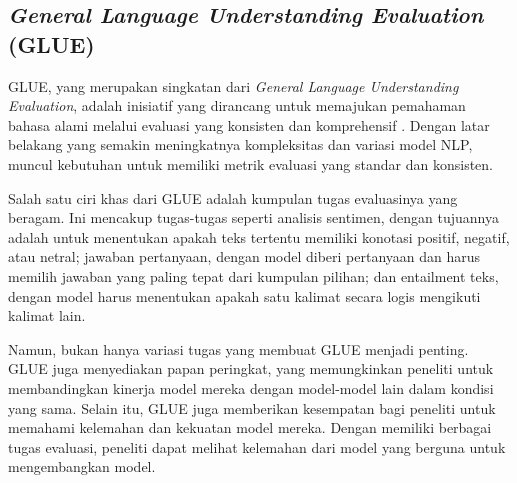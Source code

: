 \subsection{\textit{General Language Understanding Evaluation} (GLUE)}

GLUE, yang merupakan singkatan dari \textit{General Language Understanding Evaluation}, adalah inisiatif yang dirancang untuk memajukan pemahaman bahasa alami melalui evaluasi yang konsisten dan komprehensif \parencite{glue}. Dengan latar belakang yang semakin meningkatnya kompleksitas dan variasi model NLP, muncul kebutuhan untuk memiliki metrik evaluasi yang standar dan konsisten. 

Salah satu ciri khas dari GLUE adalah kumpulan tugas evaluasinya yang beragam. Ini mencakup tugas-tugas seperti analisis sentimen, dengan tujuannya adalah untuk menentukan apakah teks tertentu memiliki konotasi positif, negatif, atau netral; jawaban pertanyaan, dengan model diberi pertanyaan dan harus memilih jawaban yang paling tepat dari kumpulan pilihan; dan entailment teks, dengan model harus menentukan apakah satu kalimat secara logis mengikuti kalimat lain.

Namun, bukan hanya variasi tugas yang membuat GLUE menjadi penting. GLUE juga menyediakan papan peringkat, yang memungkinkan peneliti untuk membandingkan kinerja model mereka dengan model-model lain dalam kondisi yang sama. Selain itu, GLUE juga memberikan kesempatan bagi peneliti untuk memahami kelemahan dan kekuatan model mereka. Dengan memiliki berbagai tugas evaluasi, peneliti dapat melihat kelemahan dari model yang berguna untuk mengembangkan model.